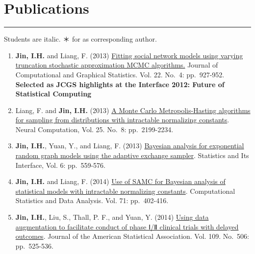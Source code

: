 \documentclass[]{book}
\begin{document}
\hypertarget{publications}{%
\section*{Publications}\label{publications}}

\begin{center}\rule{0.5\linewidth}{0.5pt}\end{center}

Students are italic. ＊ for as corresponding author.

\begin{enumerate}
\def\labelenumi{\arabic{enumi}.}
\item
  \textbf{Jin, I.H.} and Liang, F. (2013) \href{https://www.researchgate.net/publication/241724330_Fitting_Social_Network_Models_Using_Varying_Truncation_Stochastic_Approximation_MCMC_Algorithm}{Fitting social network models using varying truncation stochastic approximation MCMC algorithms.} Journal of Computational and Graphical Statistics. Vol. 22. No.~4: pp.~927-952. \textbf{Selected as JCGS highlights at the Interface 2012: Future of Statistical Computing}
\item
  Liang, F. and \textbf{Jin, I.H.} (2013) \href{https://www.researchgate.net/publication/236264661_A_Monte_Carlo_Metropolis-Hastings_Algorithm_for_Sampling_from_Distributions_with_Intractable_Normalizing_Constants}{A Monte Carlo Metropolis-Hasting algorithms for sampling from distributions with intractable normalizing constants}. Neural Computation, Vol. 25. No.~8: pp.~2199-2234.
\item
  \textbf{Jin, I.H.}, Yuan, Y., and Liang, F. (2013) \href{https://www.researchgate.net/publication/260999601_Bayesian_Analysis_for_Exponential_Random_Graph_Models_Using_the_Adaptive_Exchange_Sampler}{Bayesian analysis for exponential random graph models using the adaptive exchange sampler}. Statistics and Its Interface, Vol. 6: pp.~559-576.
\item
  \textbf{Jin, I.H.} and Liang, F. (2014) \href{https://www.researchgate.net/publication/228682695_Use_of_SAMC_for_Bayesian_Analysis_of_Statistical_Models_with_Intractable_Normalizing_Constants}{Use of SAMC for Bayesian analysis of statistical models with intractable normalizing constants}. Computational Statistics and Data Analysis. Vol. 71: pp.~402-416.
\item
  \textbf{Jin, I.H.}, Liu, S., Thall, P. F., and Yuan, Y. (2014) \href{https://pubmed.ncbi.nlm.nih.gov/25382884/}{Using data augmentation to facilitate conduct of phase Ⅰ/Ⅱ clinical trials with delayed outcomes}. Journal of the American Statistical Association. Vol. 109. No.~506: pp.~525-536.

\end{enumerate}
\end{document}
